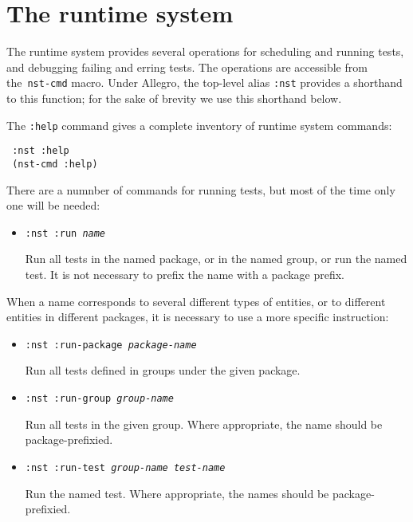\section{The runtime system}
The runtime system provides several operations for scheduling and
running tests, and debugging failing and erring tests.  The operations
are accessible from
the~\texttt{nst-cmd} macro.  Under
Allegro, the top-level alias \texttt{:nst}
provides a shorthand to this function; for the sake of brevity we use
this shorthand below.

The \texttt{:help} command gives a complete inventory of runtime
system commands:
\begin{verbatim}
 :nst :help
 (nst-cmd :help)
\end{verbatim}

There are a numnber of commands for running tests, but most of the
time only one will be needed:
\begin{itemize}
\item\texttt{:nst :run {\itshape name}}
  \par Run all tests in the named package, or in the named group, or
  run the named test.  It is not necessary to prefix the name with a
  package prefix.
\end{itemize}
When a name corresponds to several different types of entities, or to
different entities in different packages, it is necessary to use a
more specific instruction:
\begin{itemize}
\item\texttt{:nst :run-package {\itshape package-name}}
\par Run all tests defined in groups under the given package.
\item\texttt{:nst :run-group {\itshape group-name}}
  \par Run all tests in the given group.  Where appropriate, the name
  should be package-prefixied.
\item\texttt{:nst :run-test {\itshape group-name} {\itshape test-name}}
  \par Run the named test.  Where appropriate, the names should be
  package-prefixied.
\end{itemize}

